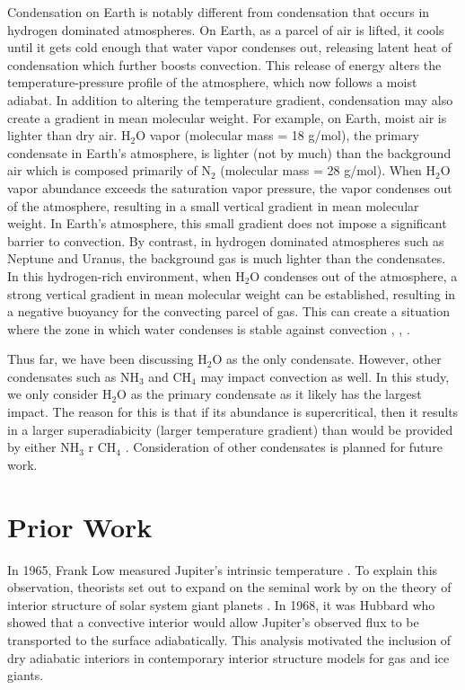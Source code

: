 \documentclass[11pt]{ucscthesisbs}
\begin{document}
Condensation on Earth is notably different from condensation that occurs in hydrogen dominated atmospheres. On Earth, as a parcel of air is lifted, it cools until it gets cold enough that water vapor condenses out, releasing latent heat of condensation which further boosts convection. This release of energy alters the temperature-pressure profile of the atmosphere, which now follows a moist adiabat.  In addition to altering the temperature gradient, condensation may also create a gradient in mean molecular weight. For example, on Earth, moist air is lighter than dry air. H$_{2}$O vapor (molecular mass = 18 g/mol), the primary condensate in Earth's atmosphere, is lighter (not by much) than the background air which is composed primarily of N$_{2}$ (molecular mass = 28 g/mol). When H$_{2}$O vapor abundance exceeds the saturation vapor pressure, the vapor condenses out of the atmosphere, resulting in a small vertical gradient in mean molecular weight. In Earth's atmosphere, this small gradient does not impose a significant barrier to convection. By contrast, in hydrogen dominated atmospheres such as Neptune and Uranus, the background gas is much lighter than the condensates. In this hydrogen-rich environment, when H$_{2}$O condenses out of the atmosphere, a strong vertical gradient in mean molecular weight can be established, resulting in a negative buoyancy for the convecting parcel of gas. This can create a situation where the zone in which water condenses is stable against convection \citep{guillot_1995}, \citep{friedson_2017}, \citep{leconte_2017}. 

Thus far, we have been discussing H$_{2}$O as the only condensate. However, other condensates such as NH$_{3}$ and CH$_{4}$ may impact convection as well. In this study, we only consider H$_{2}$O as the primary condensate as it likely has the largest impact. The reason for this is that if its abundance is supercritical, then it results in a larger superadiabicity (larger temperature gradient) than would be provided by either NH$_{3}$ r CH$_{4}$ \citep{guillot_1995}. Consideration of other condensates is planned for future work.




\section{Prior Work}
In 1965, Frank Low measured Jupiter's intrinsic temperature \citep{low_1966}. To explain this observation, theorists set out to expand on the seminal work by \citep{demarcus_1958} on the theory of interior structure of solar system giant planets \citep{hubbard_1968, smoluchowski_1967,hubbard_1977, hubbard_1977_2, podolak_1991}. In 1968, it was Hubbard who showed that a convective interior would allow Jupiter's observed flux to be transported to the surface adiabatically. This analysis motivated the inclusion of dry adiabatic interiors in contemporary interior structure models for gas and ice giants.
\end{document}
